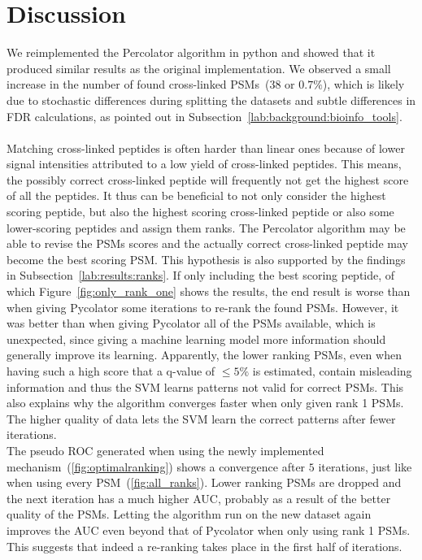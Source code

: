 
\chapter{Discussion}
\label{discussion}
We reimplemented the Percolator algorithm in python and showed that it produced similar results as the original implementation. We observed a small increase in the number of found cross-linked PSMs~(38 or $0.7\%$), which is likely due to stochastic differences during splitting the datasets and subtle differences in FDR calculations, as pointed out in Subsection~\ref{lab:background:bioinfo_tools}.\\\\
Matching cross-linked peptides is often harder than linear ones because of lower signal intensities attributed to a low yield of cross-linked peptides. This means, the possibly correct cross-linked peptide will frequently not get the highest score of all the peptides. It thus can be beneficial to not only consider the highest scoring peptide, but also the highest scoring cross-linked peptide or also some lower-scoring peptides and assign them ranks. The Percolator algorithm may be able to revise the PSMs scores and the actually correct cross-linked peptide may become the best scoring PSM. This hypothesis is also supported by the findings in Subsection~\ref{lab:results:ranks}. If only including the best scoring peptide, of which Figure~\ref{fig:only_rank_one} shows the results, the end result is worse than when giving Pycolator some iterations to re-rank the found PSMs. However, it was better than when giving Pycolator all of the PSMs available, which is unexpected, since giving a machine learning model more information should generally improve its learning. Apparently, the lower ranking PSMs, even when having such a high score that a q-value of $\leq5\%$ is estimated, contain misleading information and thus the SVM learns patterns not valid for correct PSMs. This also explains why the algorithm converges faster when only given rank 1 PSMs. The higher quality of data lets the SVM learn the correct patterns after fewer iterations. \\
The pseudo ROC generated when using the newly implemented mechanism~(\ref{fig:optimalranking}) shows a convergence after $5$ iterations, just like when using every PSM~(\ref{fig:all_ranks}). Lower ranking PSMs are dropped and the next iteration has a much higher AUC, probably as a result of the better quality of the PSMs. Letting the algorithm run on the new dataset again improves the AUC even beyond that of Pycolator when only using rank 1 PSMs. This suggests that indeed a re-ranking takes place in the first half of iterations.\\\\
